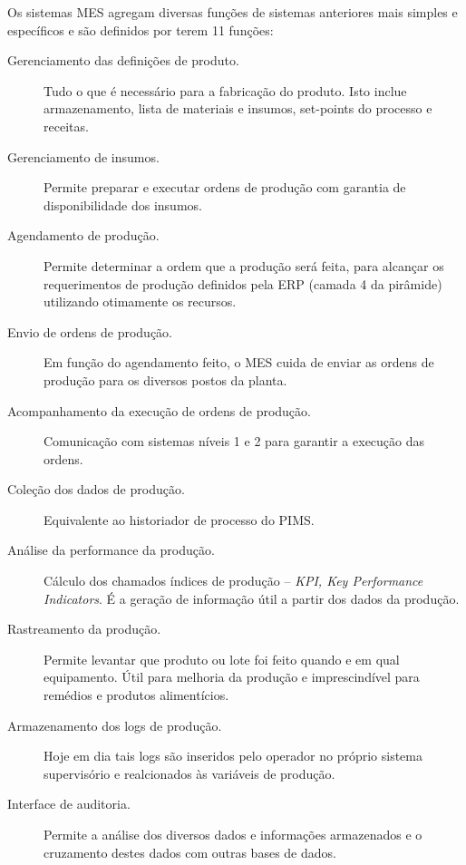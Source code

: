 Os sistemas MES agregam diversas funções de sistemas anteriores mais simples e específicos e são definidos por terem 11 funções:
\begin{description}
	\item[Gerenciamento das definições de produto.] Tudo o que é necessário para a fabricação do produto. Isto inclue armazenamento, lista de materiais e insumos, set-points do processo e receitas.
	\item[Gerenciamento de insumos.] Permite preparar e executar ordens de produção com garantia de disponibilidade dos insumos.
	\item[Agendamento de produção.] Permite determinar a ordem que a produção será feita, para alcançar os requerimentos de produção definidos pela ERP (camada 4 da pirâmide) utilizando otimamente os recursos.
	\item[Envio de ordens de produção.] Em função do agendamento feito, o MES cuida de enviar as ordens de produção para os diversos postos da planta.
	\item[Acompanhamento da execução de ordens de produção.] Comunicação com sistemas níveis 1 e 2 para garantir a execução das ordens.
	\item[Coleção dos dados de produção.] Equivalente ao historiador de processo do PIMS.
	\item[Análise da performance da produção.] Cálculo dos chamados índices de produção -- \emph{KPI, Key Performance Indicators}. É a geração de informação útil a partir dos dados da produção.
	\item[Rastreamento da produção.] Permite levantar que produto ou lote foi feito quando e em qual equipamento. Útil para melhoria da produção e imprescindível para remédios e produtos alimentícios.
	\item[Armazenamento dos logs de produção.] Hoje em dia tais logs são inseridos pelo operador no próprio sistema supervisório e realcionados às variáveis de produção.
	\item[Interface de auditoria.] Permite a análise dos diversos dados e informações armazenados e o cruzamento destes dados com outras bases de dados.
\end{description}